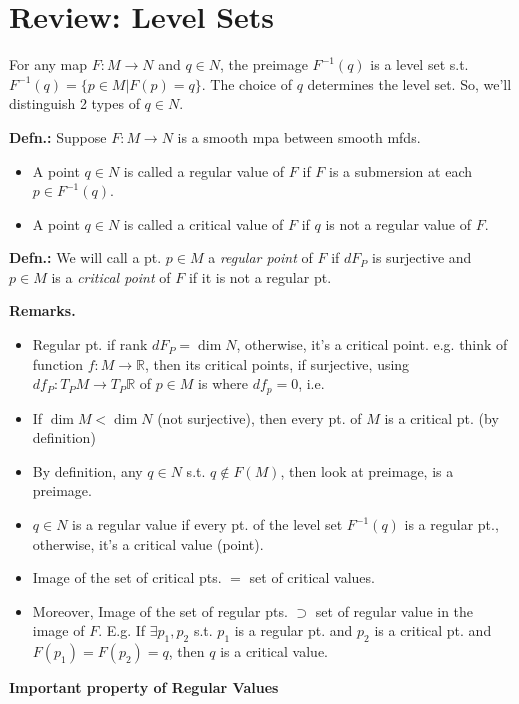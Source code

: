 \documentclass[12pt,letterpaper]{article}
\begin{document}
\section*{Review: Level Sets}

For any map $F: M \rightarrow N$ and $q \in N$, the preimage $F^{-1}(q)$ is a level set s.t. $F^{-1}(q) = \{ p \in M | F(p) = q\}$. The choice of $q$ determines the level set. So, we'll distinguish 2 types of $ q \in N$.

\textbf{Defn.:} Suppose $F: M \rightarrow N$ is a smooth mpa between smooth mfds. 
\begin{itemize}
    \item A point $q \in N$ is called a regular value of $F$ if $F$ is a submersion at each $p \in F^{-1}(q)$.
    \item A point $q \in N$ is called a critical value of $F$ if $q$ is not a regular value of $F$. 
\end{itemize}

\textbf{Defn.:} We will call a pt. $p \in M$ a \textit{regular point} of $F$ if $dF_P$ is surjective and $p \in M$ is a \textit{critical point} of $F$ if it is not a regular pt. 

\textbf{Remarks.} 
\begin{itemize}
    \item Regular pt. if rank $dF_P = \dim N$, otherwise, it's a critical point. e.g. think of function $f: M \rightarrow \mathbb{R}$, then its critical points, if surjective, using  $df_P: T_P M \rightarrow T_P \mathbb{R}$ of $p \in M$ is where $df_p = 0$, i.e.
    \item If $\dim M < \dim N$ (not surjective), then every pt. of $M$ is a critical pt. (by definition)
    \item By definition, any $q \in N$ s.t. $q \notin F(M)$, then look at preimage, is a preimage.
    \item $q \in N$ is a regular value if every pt. of the level set $F^{-1}(q)$ is a regular pt., otherwise, it's a critical value (point). 
    \item Image of the set of critical pts. $=$ set of critical values.
    \item Moreover, Image of the set of regular pts. $\supset$ set of regular value in the image of $F$. E.g. If $\exists p_1, p_2$ s.t. $p_1$ is a regular pt. and $p_2$ is a critical pt. and $F(p_1) = F(p_2) = q$, then $q$ is a critical value. 
\end{itemize}

\textbf{Important property of Regular Values}
\end{document}
